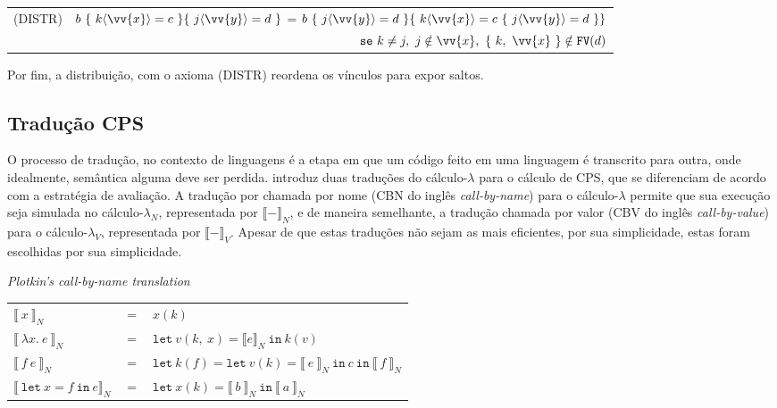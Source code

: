 \begin{center}
     \begin{tabular}{llllr}
          (DISTR) & \multicolumn{4}{l}{$b\ \{\ k\langle \vv{x} \rangle = c\ \} \{\ j\langle \vv{y} \rangle = d\ \}$ = $b\ \{\ j\langle \vv{y} \rangle = d\ \} \{\ k\langle \vv{x} \rangle = c\ \{\ j\langle \vv{y} \rangle = d\ \} \}$} \\
                  & \multicolumn{4}{r}{$\mathtt{se}\ k \ne j,\ j \notin \vv{x},\ \{\ k,\ \vv{x} \ \} \notin \mathtt{FV}(d)$} \\
     \end{tabular}
\end{center}
Por fim, a distribuição, com o axioma (DISTR) reordena os vínculos para expor saltos.

\subsection{Tradução CPS}\label{subsec:cps-translation}
O processo de tradução, no contexto de linguagens é a etapa em que um código feito em uma linguagem é transcrito para outra, onde idealmente, semântica alguma deve ser perdida.
 introduz duas traduções do cálculo-$\lambda$ para o cálculo de CPS, que se diferenciam de acordo com a estratégia de avaliação.
A tradução por chamada por nome (CBN do inglês \textit{call-by-name}) para o cálculo-$\lambda$ permite que sua execução seja simulada no cálculo-${\lambda}_N$, representada por ${\llbracket - \rrbracket}_N$, e de maneira semelhante, a tradução chamada por valor (CBV do inglês \textit{call-by-value}) para o cálculo-${\lambda}_V$, representada por ${\llbracket - \rrbracket}_V$.
Apesar de que estas traduções não sejam as mais eficientes, por sua simplicidade, estas foram escolhidas por sua simplicidade.

\phantom{Newline}

 \textit{Plotkin's call-by-name translation}

\begin{tabular}{lcl}
  ${\llbracket\ x\ \rrbracket}_N$ & $=$ & $x(k)$ \\
  ${\llbracket\ \lambda x.\ e\ \rrbracket}_N$ & $=$ & $\mathtt{let}\ v(k,\ x) = {\llbracket e \rrbracket}_N\ \mathtt{in}\ k(v)$ \\
  ${\llbracket\ f\ e\ \rrbracket}_N$ & $=$ & $\mathtt{let}\ k(f) = \mathtt{let}\ v(k) = {\llbracket\ e\ \rrbracket}_N\ \mathtt{in}\ c\ \mathtt{in}\ {\llbracket\ f\ \rrbracket}_N$ \\
  ${\llbracket\ \mathtt{let}\ x = f\ \mathtt{in}\ e \rrbracket}_N$ & $=$ & $\mathtt{let}\ x(k) = {\llbracket\ b\ \rrbracket}_N\ \mathtt{in}\ {\llbracket\ a\ \rrbracket}_N$
\end{tabular}

